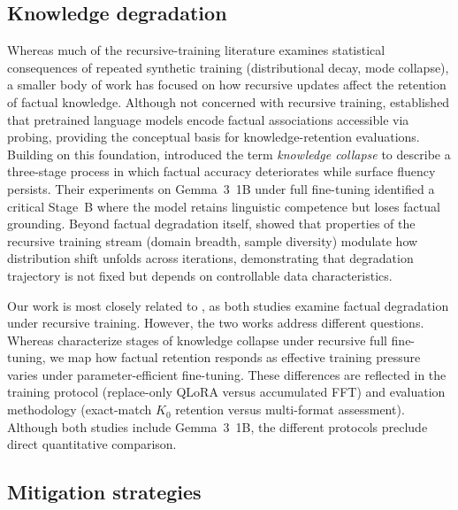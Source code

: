 \documentclass[a4paper,fleqn]{cas-dc}
\begin{document}
\subsection{Knowledge degradation}

Whereas much of the recursive-training literature examines statistical
consequences of repeated synthetic training (distributional decay, mode
collapse), a smaller body of work has focused on how recursive updates affect
the retention of factual knowledge. Although not concerned with recursive
training, \citet{petroni2019} established that pretrained language models encode
factual associations accessible via probing, providing the conceptual basis for
knowledge-retention evaluations. Building on this foundation,
\citet{keisha2025} introduced the term \textit{knowledge collapse} to describe a
three-stage process in which factual accuracy deteriorates while surface fluency
persists. Their experiments on Gemma~3~1B under full fine-tuning identified a
critical Stage~B where the model retains linguistic competence but loses factual
grounding. Beyond factual degradation itself, \citet{kovac2025recursive}
showed that properties of the recursive training stream (domain breadth, sample
diversity) modulate how distribution shift unfolds across iterations,
demonstrating that degradation trajectory is not fixed but depends on
controllable data characteristics.

Our work is most closely related to \citet{keisha2025}, as both studies examine
factual degradation under recursive training. However, the two works address
different questions. Whereas \citet{keisha2025} characterize stages of knowledge
collapse under recursive full fine-tuning, we map how factual retention responds
as effective training pressure varies under parameter-efficient fine-tuning.
These differences are reflected in the training protocol (replace-only QLoRA
versus accumulated FFT) and evaluation methodology (exact-match $K_0$ retention
versus multi-format assessment). Although both studies include Gemma~3~1B, the
different protocols preclude direct quantitative comparison.

\subsection{Mitigation strategies}
\end{document}
